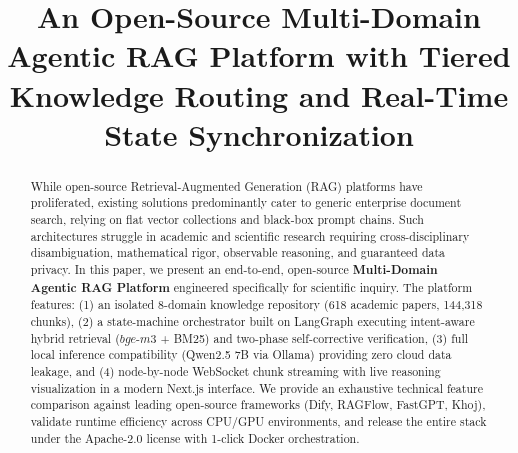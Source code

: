 \documentclass[conference]{IEEEtran}
\begin{document}
\raggedbottom

\title{An Open-Source Multi-Domain Agentic RAG Platform with Tiered Knowledge Routing and Real-Time State Synchronization}

\author{
  \and
}

\maketitle

\begin{abstract}
While open-source Retrieval-Augmented Generation (RAG) platforms have proliferated, existing solutions predominantly cater to generic enterprise document search, relying on flat vector collections and black-box prompt chains. Such architectures struggle in academic and scientific research requiring cross-disciplinary disambiguation, mathematical rigor, observable reasoning, and guaranteed data privacy. In this paper, we present an end-to-end, open-source \textbf{Multi-Domain Agentic RAG Platform} engineered specifically for scientific inquiry. The platform features: (1) an isolated 8-domain knowledge repository (618 academic papers, 144,318 chunks), (2) a state-machine orchestrator built on LangGraph executing intent-aware hybrid retrieval ($bge\text{-}m3$ + BM25) and two-phase self-corrective verification, (3) full local inference compatibility (Qwen2.5 7B via Ollama) providing zero cloud data leakage, and (4) node-by-node WebSocket chunk streaming with live reasoning visualization in a modern Next.js interface. We provide an exhaustive technical feature comparison against leading open-source frameworks (Dify, RAGFlow, FastGPT, Khoj), validate runtime efficiency across CPU/GPU environments, and release the entire stack under the Apache-2.0 license with 1-click Docker orchestration.
\end{abstract}
\end{document}
